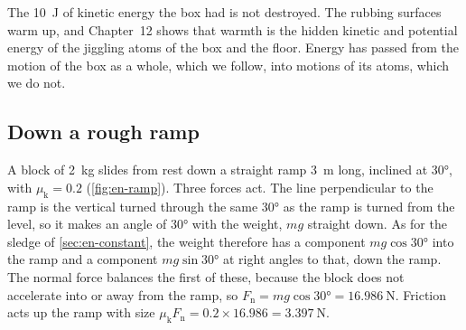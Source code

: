 The \SI{10}{\joule} of kinetic energy the box had is not destroyed. The
rubbing surfaces warm up, and Chapter~12 shows that warmth is the hidden
kinetic and potential energy of the jiggling atoms of the box and the
floor. Energy has passed from the motion of the box as a whole, which we
follow, into motions of its atoms, which we do not.

\subsection*{Down a rough ramp}

A block of \SI{2}{\kilogram} slides from rest down a straight ramp
\SI{3}{\metre} long, inclined at \ang{30}, with $\mu_{\mathrm{k}} = 0.2$
(\cref{fig:en-ramp}). Three forces act. The line perpendicular to the
ramp is the vertical turned through the same \ang{30} as the ramp is
turned from the level, so it makes an angle of \ang{30} with the weight,
$mg$ straight down. As for the sledge of \cref{sec:en-constant}, the
weight therefore has a component $mg\cos\ang{30}$ into the ramp and a
component $mg\sin\ang{30}$ at right angles to that, down the ramp. The
normal force balances the first of these, because the block does not
accelerate into or away from the ramp, so $F_{\mathrm{n}} = mg\cos\ang{30}
= \SI{16.986}{\newton}$. Friction acts up the ramp with size
$\mu_{\mathrm{k}}F_{\mathrm{n}} = 0.2\times16.986 = \SI{3.397}{\newton}$.

